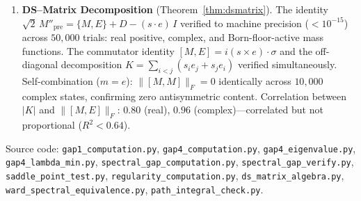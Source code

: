 \documentclass[11pt,a4paper]{article}
\theoremstyle{definition}
\theoremstyle{remark}
\newcommand{\dbar}{\bar{\partial}}
\begin{document}
\begin{enumerate}[nosep]
On coupled 1D ($N\!=\!30$) and 3D ($N\!=\!8^3$) lattices with non-trivial initial orientation patterns: the dynamics converges to the DS equilibrium where $\|\dbar\Phi\|=1.12$ (Remark~\ref{rem:floor_active}). The anti-holomorphic Jacobian is nonzero at the equilibrium because the floor fires at every DS step (the DS map contracts $\theta$, and the floor restores it). The Born floor held at $1/27$ in every configuration. The bound $\|\dbar\Phi_{(3,1)\oplus(1,3)}\|\leq C_{\mathrm{gauge}}=0.344$ (Theorem~\ref{thm:regularity}) holds uniformly.

\item \textbf{DS--Matrix Decomposition} (Theorem~\ref{thm:dsmatrix}). The identity $\sqrt{2}\,M''_{\mathrm{pre}}=\{M,E\}+D-(s\cdot e)\,I$ verified to machine precision ($<10^{-15}$) across $50{,}000$ trials: real positive, complex, and Born-floor-active mass functions. The commutator identity $[M,E]=i(s\times e)\cdot\sigma$ and the off-diagonal decomposition $K=\sum_{i<j}(s_ie_j+s_je_i)$ verified simultaneously. Self-combination ($m=e$): $\|[M,M]\|_F=0$ identically across $10{,}000$ complex states, confirming zero antisymmetric content. Correlation between $|K|$ and $\|[M,E]\|_F$: $0.80$ (real), $0.96$ (complex)---correlated but not proportional ($R^2<0.64$).
\end{enumerate}

Source code: \texttt{gap1\_computation.py}, \texttt{gap4\_computation.py}, \texttt{gap4\_eigenvalue.py}, \texttt{gap4\_lambda\_min.py}, \texttt{spectral\_gap\_computation.py}, \texttt{spectral\_gap\_verify.py}, \texttt{saddle\_point\_test.py}, \texttt{regularity\_computation.py}, \texttt{ds\_matrix\_algebra.py}, \texttt{ward\_spectral\_equivalence.py}, \texttt{path\_integral\_check.py}.
\end{document}
